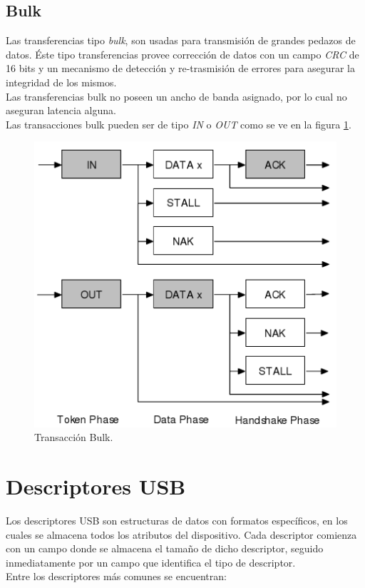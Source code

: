 \subsection{Bulk}
Las transferencias tipo \emph{bulk}, son usadas para transmisi\'on de grandes
pedazos de datos. \'Este tipo transferencias provee correcci\'on de datos
con un campo \emph{CRC} de 16 bits y un mecanismo de detecci\'on y
re-trasmisi\'on de errores para asegurar la integridad de los mismos.\\

Las transferencias bulk no poseen un ancho de banda asignado, por lo cual no
aseguran latencia alguna.\\

Las transacciones bulk pueden ser de tipo \emph{IN} o \emph{OUT} como se ve en
la figura \ref{fig:usb_bulk_transaction}.

\begin{figure}[htp]
\centering
\includegraphics[scale=0.5]{./img/usb_bulk_transaction.png}
\caption{Transacci\'on Bulk.}
\label{fig:usb_bulk_transaction}
\end{figure}


\clearpage
\section{Descriptores USB}
Los descriptores USB son estructuras de datos con formatos espec\'ificos, en
los cuales se almacena todos los atributos del dispositivo.
Cada descriptor comienza con un campo donde se almacena el tama\~no de dicho
descriptor, seguido inmediatamente por un campo que identifica el tipo de
descriptor.\\
Entre los descriptores m\'as comunes se encuentran:

